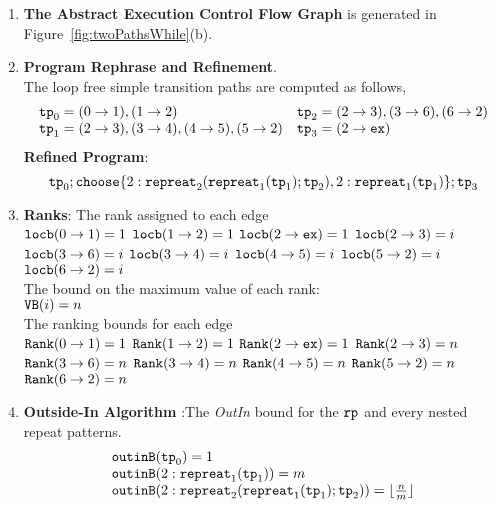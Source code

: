 \begin{enumerate}
  \item  \textbf{The Abstract Execution Control Flow Graph} is generated in Figure~\ref{fig:twoPathsWhile}(b).

  \item \textbf{Program Rephrase and Refinement}. 
  \\
  The loop free simple transition paths are computed as follows,
  \[
    \begin{array}{ll}
\mathtt{tp}_0 = (0 \to 1), (1 \to 2)
&
\mathtt{tp}_2 = (2 \to 3), (3 \to 6), (6 \to 2)
\\
\mathtt{tp}_1 = (2 \to 3), (3 \to 4), (4 \to 5), (5 \to 2)
&
\mathtt{tp}_3 = (2 \to \mathtt{ex})
\end{array}
\]
\textbf{Refined Program}:
\[
  \tpath_0 ; \rpchoose{2: \rprepeat_2(\rprepeat_1(\tpath_1); \tpath_2) , 
  2: \rprepeat_1(\tpath_1) }; \tpath_3
  \]
  \item \textbf{Ranks}:
  The rank assigned to each edge
  \\  $\mathtt{locb}(0 \to 1) = 1$ \quad
      $\mathtt{locb}(1 \to 2) = 1$ \quad
      $\mathtt{locb}(2 \to \mathtt{ex}) = 1$ 
      \quad $\mathtt{locb}(2 \to 3) = i$ 
      \quad $\mathtt{locb}(3 \to 6) = i$ 
      \quad $\mathtt{locb}(3 \to 4) = i$ 
      \quad $\mathtt{locb}(4 \to 5) = i$ 
      \quad $\mathtt{locb}(5 \to 2) = i$ 
      \quad $\mathtt{locb}(6 \to 2) = i$ 
  \\
  The bound on the maximum value of each rank:
  \\
  ${\mathtt{VB}}(i) = n$
  \\
  The ranking bounds for each edge
  \\  ${\mathtt{Rank}}(0 \to 1) = 1$ \quad
      ${\mathtt{Rank}}(1 \to 2) = 1$ \quad
      ${\mathtt{Rank}}(2 \to \mathtt{ex}) = 1$ 
      \quad ${\mathtt{Rank}}(2 \to 3) = n$ 
      \quad ${\mathtt{Rank}}(3 \to 6) = n$ 
      \quad ${\mathtt{Rank}}(3 \to 4) = n$ 
      \quad ${\mathtt{Rank}}(4 \to 5) = n$ 
      \quad ${\mathtt{Rank}}(5 \to 2) = n$ 
      \quad ${\mathtt{Rank}}(6 \to 2) = n$ 
    \item \textbf{Outside-In Algorithm} :The \emph{OutIn} bound for the $\mathtt{rp}$ and every nested repeat patterns.
  \[
    \begin{array}{l}
        \mathtt{outinB}(\mathtt{tp}_0) = 1
        \\
        \mathtt{outinB}(2: \mathtt{repreat}_1(\mathtt{tp}_1)) = m 
        \\
        \mathtt{outinB}(2: \mathtt{repreat}_2(\mathtt{repreat}_1(\mathtt{tp}_1); \mathtt{tp}_2)) = \lfloor\frac{n}{m}\rfloor

\end{array}\]
\end{enumerate}
